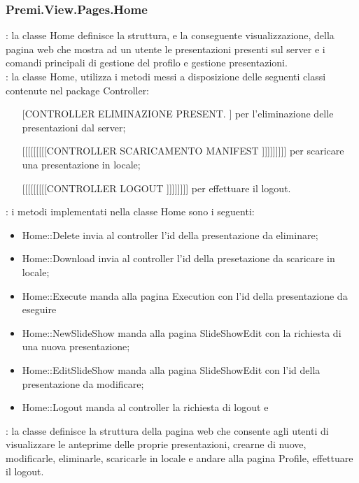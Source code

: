{		\subsubsection{Premi.View.Pages.Home}{
			\textbf{\tipo}: la classe Home definisce la struttura, e la conseguente visualizzazione, della pagina web che mostra ad un utente le presentazioni presenti sul server e i comandi principali di gestione del profilo e gestione presentazioni.\\	
			\textbf{\relaz}: la classe Home, utilizza i metodi messi a disposizione delle seguenti classi contenute nel package Controller: 
			\begin{itemize}
				\item [[CONTROLLER ELIMINAZIONE PRESENT.]] per l'eliminazione delle presentazioni dal server;
				\item [[[[[[[[[[CONTROLLER SCARICAMENTO MANIFEST]]]]]]]]]] per scaricare una presentazione in locale;
				\item [[[[[[[[[[CONTROLLER LOGOUT]]]]]]]]] per effettuare il logout.
			\end{itemize} 
			\textbf{\interfacce}: i metodi implementati nella classe Home sono i seguenti:
			\begin{itemize}
				\item Home::Delete invia al controller l'id della presentazione da eliminare;
				\item Home::Download invia al controller l'id della presetazione da scaricare in locale;
				\item Home::Execute manda alla pagina Execution con l'id della presentazione da eseguire
				\item Home::NewSlideShow manda alla pagina SlideShowEdit con la richiesta di una nuova presentazione;
				\item Home::EditSlideShow manda alla pagina SlideShowEdit con l'id della presentazione da modificare;
				\item Home::Logout manda al controller la richiesta di logout e 				
			\end{itemize} 
			\textbf{\attivita}: la classe definisce la struttura della pagina web che consente agli utenti di visualizzare le anteprime delle proprie presentazioni, crearne di nuove, modificarle, eliminarle, scaricarle in locale e andare alla pagina Profile, effettuare il logout.\\
		}
}
